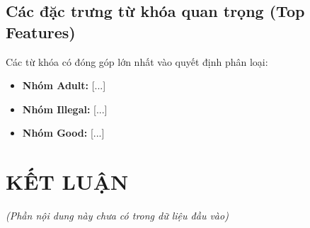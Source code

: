 \documentclass[a4paper,12pt]{report}
\begin{document}
\section{Các đặc trưng từ khóa quan trọng (Top Features)}
Các từ khóa có đóng góp lớn nhất vào quyết định phân loại:
\begin{itemize}
    \item \textbf{Nhóm Adult:} [...]
    \item \textbf{Nhóm Illegal:} [...]
    \item \textbf{Nhóm Good:} [...]
\end{itemize}

\chapter{KẾT LUẬN}
\textit{(Phần nội dung này chưa có trong dữ liệu đầu vào)}
\end{document}
